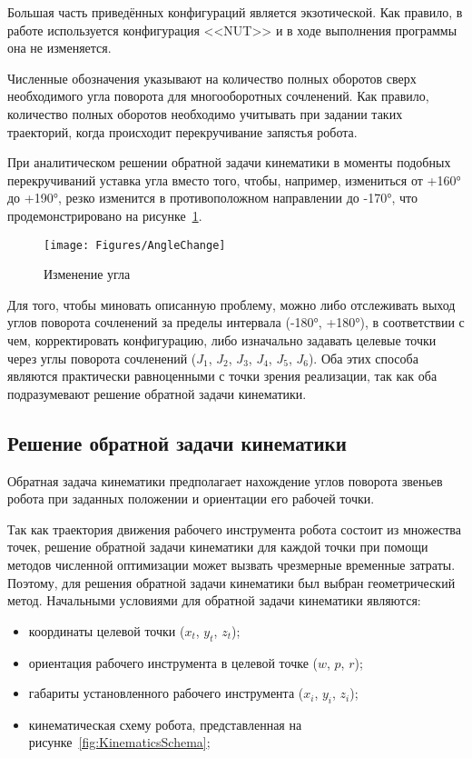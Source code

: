 Большая часть приведённых конфигураций является экзотической.
Как правило, в работе используется конфигурация <<NUT>> и в ходе выполнения программы она не изменяется.

Численные обозначения указывают на количество полных оборотов сверх необходимого угла поворота для многооборотных сочленений.
Как правило, количество полных оборотов необходимо учитывать при задании таких траекторий, когда происходит перекручивание запястья робота.

При аналитическом решении обратной задачи кинематики в моменты подобных перекручиваний уставка угла вместо того, чтобы, например, измениться от +160° до +190°, резко изменится в противоположном направлении до -170°, что продемонстрировано на рисунке~\ref{fig:AngleChange}.

\begin{figure}[H]
    \centering
    \vspace{14pt}
    \texttt{[image: Figures/AngleChange]}
    \caption{Изменение угла}
    \label{fig:AngleChange}
\end{figure}

Для того, чтобы миновать описанную проблему, можно либо отслеживать выход углов поворота сочленений за пределы интервала (-180°, +180°), в соответствии с чем, корректировать конфигурацию, либо изначально задавать целевые точки через углы поворота сочленений ($J_1$, $J_2$, $J_3$, $J_4$, $J_5$, $J_6$).
Оба этих способа являются практически равноценными с точки зрения реализации, так как оба подразумевают решение обратной задачи кинематики.

\subsection{Решение обратной задачи кинематики}
Обратная задача кинематики предполагает нахождение углов поворота звеньев робота при заданных положении и ориентации его рабочей точки.

Так как траектория движения рабочего инструмента робота состоит из множества точек, решение обратной задачи кинематики для каждой точки при помощи методов численной оптимизации может вызвать чрезмерные временные затраты.
Поэтому, для решения обратной задачи кинематики был выбран геометрический метод.
Начальными условиями для обратной задачи кинематики являются:

\begin{itemize}
    \item координаты целевой точки ($x_t$, $y_t$, $z_t$);
    \item ориентация рабочего инструмента в целевой точке ($w$, $p$, $r$);
    \item габариты установленного рабочего инструмента ($x_i$, $y_i$, $z_i$);
    \item кинематическая схему робота, представленная на рисунке~\ref{fig:KinematicsSchema};
\end{itemize}

